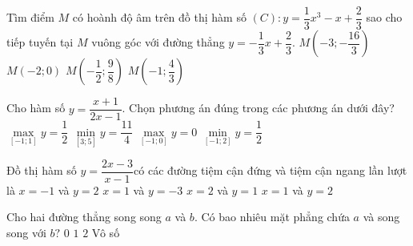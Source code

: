 \begin{ex}%
Tìm điểm $M$ có hoành độ âm trên đồ thị hàm số $(C)\colon y=\dfrac{1}{3}x^3-x+\dfrac{2}{3}$ sao cho tiếp tuyến tại $M$ vuông góc với đường thẳng $y=-\dfrac{1}{3}x+\dfrac{2}{3}$.
\choice
{$M\left(-3;-\dfrac{16}{3}\right)$}
{\True $M\left(-2;0\right)$}
{$M\left(-\dfrac{1}{2};\dfrac{9}{8}\right)$}
{$M\left(-1;\dfrac{4}{3}\right)$}
\end{ex}
\begin{ex}%
Cho hàm số $y=\dfrac{x+1}{2x-1}$. Chọn phương án đúng trong các phương án dưới đây?
\choice
{$\max\limits_{[-1;1]}y=\dfrac{1}{2}$}
{$\min\limits_{[3;5]}y=\dfrac{11}{4}$}
{\True $\max\limits_{[-1;0]}y=0$}
{$\min\limits_{[-1;2]}y=\dfrac{1}{2}$}
\end{ex}
\begin{ex}%
Đồ thị hàm số $y=\dfrac{2x-3}{x-1}$có các đường tiệm cận đứng và tiệm cận ngang lần lượt là
\choice
{$x=-1$ và $y=2$}
{$x=1$ và $y=-3$}
{$x=2$ và $y=1$}
{\True $x=1$ và $y=2$}
\end{ex}
\begin{ex}%
Cho hai đường thẳng song song $a$ và $b$. Có bao nhiêu mặt phẳng chứa $a$ và song song với $b?$
\choice
{$0$}
{$1$}
{$2$}
{\True Vô số}
\end{ex}
